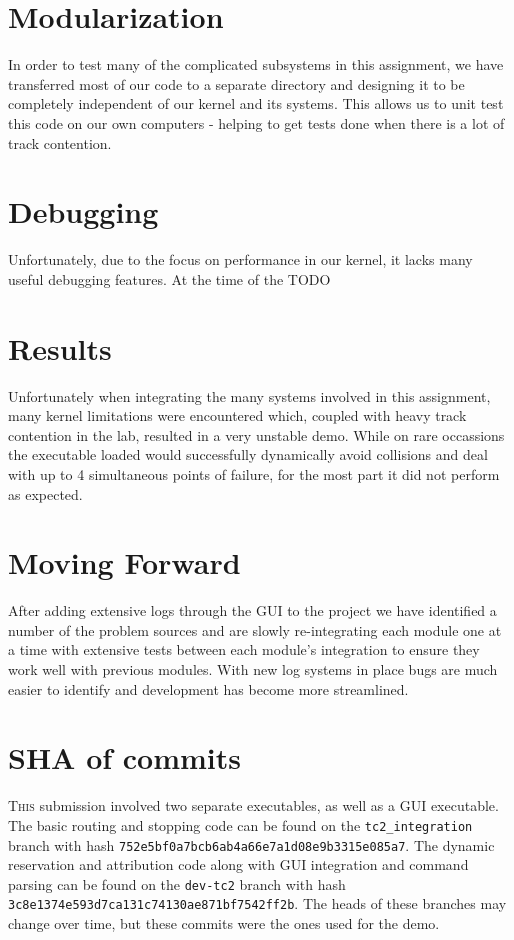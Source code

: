 \documentclass{amsart}
\begin{document}
\section*{Modularization}

In order to test many of the complicated subsystems in this assignment, we have
transferred most of our code to a separate directory and designing it to be
completely independent of our kernel and its systems. This allows us to unit
test this code on our own computers - helping to get tests done when there is a
lot of track contention.

\section*{Debugging}

Unfortunately, due to the focus on performance in our kernel, it lacks many
useful debugging features. At the time of the TODO

\section*{Results}

Unfortunately when integrating the many systems involved in this assignment,
many kernel limitations were encountered which, coupled with heavy track
contention in the lab, resulted in a very unstable demo. While on rare
occassions the executable loaded would successfully dynamically avoid collisions
and deal with up to 4 simultaneous points of failure, for the most part it did
not perform as expected.

\section*{Moving Forward}

After adding extensive logs through the GUI to the project we have identified a
number of the problem sources and are slowly re-integrating each module one at a
time with extensive tests between each module's integration to ensure they work
well with previous modules. With new log systems in place bugs are much easier
to identify and development has become more streamlined.

\section*{SHA of commits}

\textsc{This} submission involved two separate executables, as well as a GUI
executable. The basic routing and stopping code can be found on the
\texttt{tc2\_integration} branch with hash
\texttt{752e5bf0a7bcb6ab4a66e7a1d08e9b3315e085a7}. The dynamic reservation and
attribution code along with GUI integration and command parsing can be found on
the \texttt{dev-tc2} branch with hash
\texttt{3c8e1374e593d7ca131c74130ae871bf7542ff2b}. The heads of these branches
may change over time, but these commits were the ones used for the demo.
\end{document}
